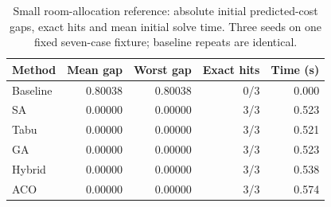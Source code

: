 \begin{table}[H]
\centering\small
\caption{Small room-allocation reference: absolute initial predicted-cost gaps, exact hits and mean initial solve time. Three seeds on one fixed seven-case fixture; baseline repeats are identical.}
\label{tab:room-exact}
\begin{tabular}{@{}lrrrr@{}}
\toprule
Method & Mean gap & Worst gap & Exact hits & Time (s) \\
\midrule
Baseline & 0.80038 & 0.80038 & 0/3 & 0.000 \\
SA & 0.00000 & 0.00000 & 3/3 & 0.523 \\
Tabu & 0.00000 & 0.00000 & 3/3 & 0.521 \\
GA & 0.00000 & 0.00000 & 3/3 & 0.523 \\
Hybrid & 0.00000 & 0.00000 & 3/3 & 0.538 \\
ACO & 0.00000 & 0.00000 & 3/3 & 0.574 \\
\bottomrule
\end{tabular}
\end{table}
